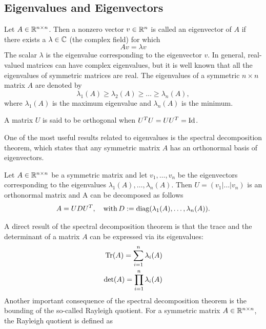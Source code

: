 \documentclass[10pt,a4paper]{article}
\begin{document}
\subsection{Eigenvalues and Eigenvectors}
Let $A \in \mathbb{R}^{n\times n}$. Then a nonzero vector $v \in \mathbb{R}^n$ is called an eigenvector of $A$ if there exists a $\lambda \in \mathbb{C}$ (the complex field) for which
\begin{equation*}
	A v = \lambda v
\end{equation*}
The scalar $\lambda$ is the eigenvalue corresponding to the eigenvector $v$. In general, real-valued matrices can have complex eigenvalues, but it is well known that all the eigenvalues of symmetric matrices are real. The eigenvalues of a symmetric $n \times n$ matrix $A$ are denoted by
\begin{equation*}
	\lambda_1(A)\geq \lambda_2(A) \geq \dots \geq \lambda_n(A),
\end{equation*}
where $\lambda_1(A)$ is the maximum eigenvalue and $\lambda_n(A)$ is the minimum.
\begin{definition}
	A matrix $U$ is said to be orthogonal when $U^TU =UU^T=\mathord{\mathrm{Id}}$.
\end{definition}
One of the most useful results related to eigenvalues is the spectral decomposition theorem, which states that any symmetric matrix $A$ has an orthonormal basis of eigenvectors.
\begin{theorem}
	Let $A\in \mathbb{R}^{n\times n}$ be a symmetric matrix and let $v_1,\dots, v_n$ be the eigenvectors corresponding to the eigenvalues $\lambda_1(A), \dots, \lambda_n(A)$. Then $U= \left(v_1 | \dots | v_n\right)$ is an orthonormal matrix and A can be decomposed as follows 
	\begin{equation*}
		A = UDU^T, \quad \mathord{\mathrm{with }}\, D:=\mathord{\mathrm{diag}}(\lambda_1(A), \dots, \lambda_n(A)).
	\end{equation*}
\end{theorem}
A direct result of the spectral decomposition theorem is that the trace and the determinant of a matrix $A$ can be expressed via its eigenvalues:
\begin{equation*}
	\begin{split}
		\mathord{\mathrm{Tr}}(A) = \sum_{i=1}^n \lambda_i(A)\\
		\det(A) = \prod_{i=1}^n \lambda_i(A)
	\end{split}
\end{equation*}
Another important consequence of the spectral decomposition theorem is the bounding of the so-called Rayleigh quotient. For a symmetric matrix $A \in \mathbb{R}^{n\times n}$, the Rayleigh quotient is defined as
\end{document}
